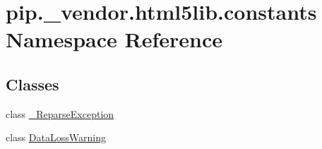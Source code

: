 \hypertarget{namespacepip_1_1__vendor_1_1html5lib_1_1constants}{}\section{pip.\+\_\+vendor.\+html5lib.\+constants Namespace Reference}
\label{namespacepip_1_1__vendor_1_1html5lib_1_1constants}
\subsection*{Classes}
\begin{DoxyCompactItemize}
\item 
class \hyperlink{classpip_1_1__vendor_1_1html5lib_1_1constants_1_1__ReparseException}{\+\_\+\+Reparse\+Exception}
\item 
class \hyperlink{classpip_1_1__vendor_1_1html5lib_1_1constants_1_1DataLossWarning}{Data\+Loss\+Warning}
\end{DoxyCompactItemize}

